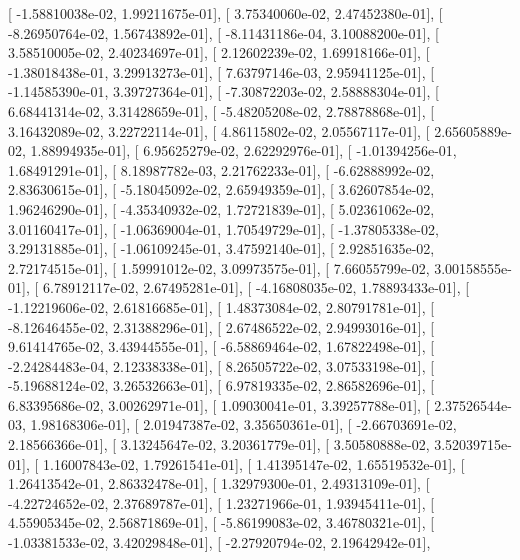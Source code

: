 \documentclass{article}
\begin{document}
       [ -1.58810038e-02,   1.99211675e-01],
       [  3.75340060e-02,   2.47452380e-01],
       [ -8.26950764e-02,   1.56743892e-01],
       [ -8.11431186e-04,   3.10088200e-01],
       [  3.58510005e-02,   2.40234697e-01],
       [  2.12602239e-02,   1.69918166e-01],
       [ -1.38018438e-01,   3.29913273e-01],
       [  7.63797146e-03,   2.95941125e-01],
       [ -1.14585390e-01,   3.39727364e-01],
       [ -7.30872203e-02,   2.58888304e-01],
       [  6.68441314e-02,   3.31428659e-01],
       [ -5.48205208e-02,   2.78878868e-01],
       [  3.16432089e-02,   3.22722114e-01],
       [  4.86115802e-02,   2.05567117e-01],
       [  2.65605889e-02,   1.88994935e-01],
       [  6.95625279e-02,   2.62292976e-01],
       [ -1.01394256e-01,   1.68491291e-01],
       [  8.18987782e-03,   2.21762233e-01],
       [ -6.62888992e-02,   2.83630615e-01],
       [ -5.18045092e-02,   2.65949359e-01],
       [  3.62607854e-02,   1.96246290e-01],
       [ -4.35340932e-02,   1.72721839e-01],
       [  5.02361062e-02,   3.01160417e-01],
       [ -1.06369004e-01,   1.70549729e-01],
       [ -1.37805338e-02,   3.29131885e-01],
       [ -1.06109245e-01,   3.47592140e-01],
       [  2.92851635e-02,   2.72174515e-01],
       [  1.59991012e-02,   3.09973575e-01],
       [  7.66055799e-02,   3.00158555e-01],
       [  6.78912117e-02,   2.67495281e-01],
       [ -4.16808035e-02,   1.78893433e-01],
       [ -1.12219606e-02,   2.61816685e-01],
       [  1.48373084e-02,   2.80791781e-01],
       [ -8.12646455e-02,   2.31388296e-01],
       [  2.67486522e-02,   2.94993016e-01],
       [  9.61414765e-02,   3.43944555e-01],
       [ -6.58869464e-02,   1.67822498e-01],
       [ -2.24284483e-04,   2.12338338e-01],
       [  8.26505722e-02,   3.07533198e-01],
       [ -5.19688124e-02,   3.26532663e-01],
       [  6.97819335e-02,   2.86582696e-01],
       [  6.83395686e-02,   3.00262971e-01],
       [  1.09030041e-01,   3.39257788e-01],
       [  2.37526544e-03,   1.98168306e-01],
       [  2.01947387e-02,   3.35650361e-01],
       [ -2.66703691e-02,   2.18566366e-01],
       [  3.13245647e-02,   3.20361779e-01],
       [  3.50580888e-02,   3.52039715e-01],
       [  1.16007843e-02,   1.79261541e-01],
       [  1.41395147e-02,   1.65519532e-01],
       [  1.26413542e-01,   2.86332478e-01],
       [  1.32979300e-01,   2.49313109e-01],
       [ -4.22724652e-02,   2.37689787e-01],
       [  1.23271966e-01,   1.93945411e-01],
       [  4.55905345e-02,   2.56871869e-01],
       [ -5.86199083e-02,   3.46780321e-01],
       [ -1.03381533e-02,   3.42029848e-01],
       [ -2.27920794e-02,   2.19642942e-01],
\end{document}
